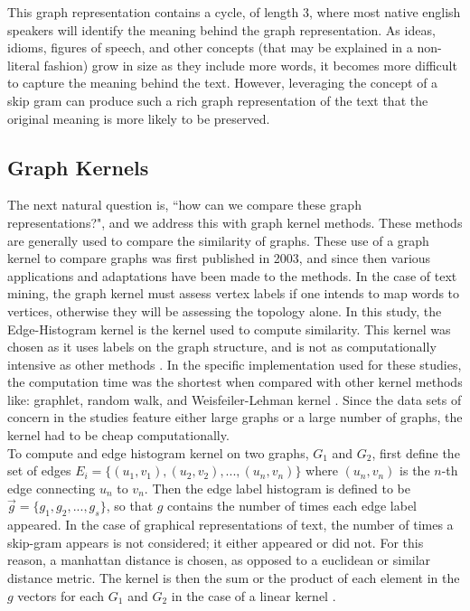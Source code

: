 This graph representation contains a cycle, of length 3, where most native english speakers will identify the meaning behind the graph representation. As ideas, idioms, figures of speech, and other concepts (that may be explained in a non-literal fashion) grow in size as they include more words, it becomes more difficult to capture the meaning behind the text. However, leveraging the concept of a skip gram can produce such a rich graph representation of the text that the original meaning is more likely to be preserved. \\

\subsection{ Graph Kernels}
The next natural question is, ``how can we compare these graph representations?", and we address this with graph kernel methods. These methods are generally used to compare the similarity of graphs. These use of a graph kernel to compare graphs was first published in 2003, and since then various applications and adaptations have been made to the methods. In the case of text mining, the graph kernel must assess vertex labels \textemdash if one intends to map words to vertices, otherwise they will be assessing the topology alone. In this study, the Edge-Histogram kernel is the kernel used to compute similarity. This kernel was chosen as it uses labels on the graph structure, and is not as computationally intensive as other methods \cite{sugiyama2015halting}. In the specific implementation used for these studies, the computation time was the shortest when compared with other kernel methods like: graphlet, random walk, and Weisfeiler-Lehman kernel \cite{sugiyama2015halting}. Since the data sets of concern in the studies feature either large graphs or a large number of graphs, the kernel had to be cheap computationally.\\

To compute and edge histogram kernel on two graphs, $G_1$ and $G_2$, first define the set of edges $E_i =\{ (u_1,v_1), (u_2,v_2), ... , (u_n,v_n) \}$ where $(u_n,v_n)$ is the $n$-th edge connecting $u_n$ to $v_n$. Then the edge label histogram is defined to be $\vec{g} = \{ g_1, g_2, ... , g_s\}$, so that $g$ contains the number of times each edge label appeared. In the case of graphical representations of text, the number of times a skip-gram appears is not considered; it either appeared or did not. For this reason, a manhattan distance is chosen, as opposed to a euclidean or similar distance metric. The kernel is then the sum or the product of each element in the $g$ vectors for each $G_1$ and $G_2$ in the case of a linear kernel \cite{sugiyama2015halting}.



